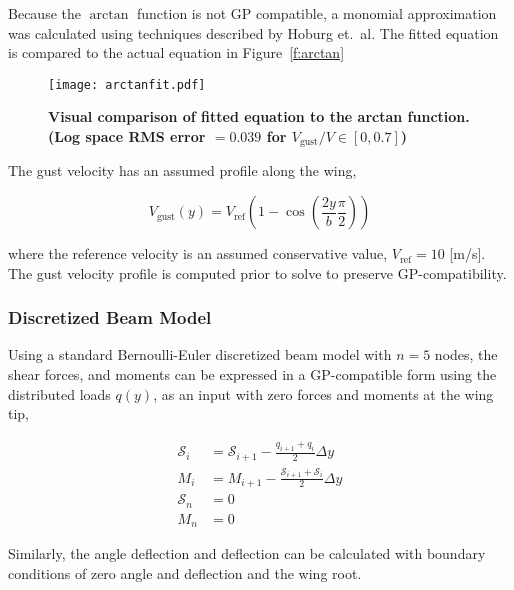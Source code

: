 Because the $\arctan$ function is not GP compatible, a monomial approximation was calculated using techniques described by Hoburg et.~al\cite{fitting}.  The fitted equation is compared to the actual equation in Figure~\ref{f:arctan}

\begin{figure}[h!]
	\begin{center}
	\texttt{[image: arctanfit.pdf]}
    \caption{\textbf{Visual comparison of fitted equation to the arctan function.  (Log space RMS error $=0.039$ for $V_{\text{gust}}/V \in [0, 0.7]$)}}
	\label{f:capspar}
	\end{center}
\end{figure}

The gust velocity has an assumed profile along the wing\cite{acgust},

\begin{equation}
    \label{e:gustwind}
    V_{\text{gust}}(y) = V_{\text{ref}} \left(1-\cos\left(\frac{2y}{b} \frac{\pi}{2} \right) \right)
\end{equation}

where the reference velocity is an assumed conservative value\cite{acgust}, $V_{\text{ref}} = 10$ [m/s]. The gust velocity profile is computed prior to solve to preserve GP-compatibility.

\subsubsection{Discretized Beam Model}

Using a standard Bernoulli-Euler discretized beam model with $n=5$ nodes\cite{bending}, the shear forces, and moments can be expressed in a GP-compatible form using the distributed loads $q(y)$, as an input with zero forces and moments at the wing tip,

\begin{align}
    \label{e:shear}
    \mathcal{S}_i &= \mathcal{S}_{i+1} - \frac{q_{i+1} + q_i}{2}\Delta y \\
    \label{e:moment}
    M_i &= M_{i+1} - \frac{\mathcal{S}_{i+1} + \mathcal{S}_i}{2}\Delta y \\
    \label{e:shearboundary}
    \mathcal{S}_n &= 0 \\
    \label{e:momentboundary}
    M_n &= 0
\end{align}

Similarly, the angle deflection and deflection can be calculated with boundary conditions of zero angle and deflection and the wing root.\cite{bending}

